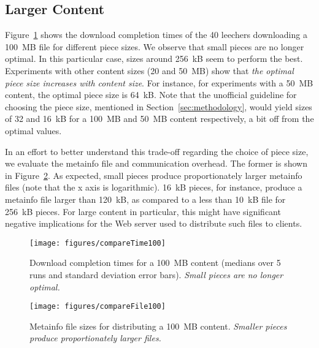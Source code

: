 \documentclass[twocolumn,letterpaper,11pt]{article}
\begin{document}
\subsection{Larger Content}

Figure~\ref{fig:large_contents-completion_comparison} shows the download 
completion times of the 40 leechers downloading a 100~MB file for different
piece sizes. 
We observe that small pieces are no longer optimal. In this particular
case, sizes around 256~kB seem to perform the best.
Experiments with other content sizes (20 and 50~MB) show that \emph{the optimal piece 
size increases with content size}. 
For instance, for experiments with a 50~MB content, the optimal piece size is 64~kB.
Note that the unofficial guideline for choosing the piece size, mentioned in 
Section~\ref{sec:methodology}, would yield sizes of 32 and 16~kB for a 100~MB and 50~MB
content respectively, a bit off from the optimal values.

In an effort to better understand this trade-off regarding the choice of piece size, we evaluate
the metainfo file and communication overhead. The former is
shown in Figure~\ref{fig:large_contents-metainfo_size}.
As expected, small pieces produce proportionately larger metainfo files (note that
the x axis is logarithmic).
16~kB pieces, for instance, 
produce a metainfo file larger than 120~kB, as compared to a less 
than 10~kB file for 256~kB pieces.
For large content in particular, this might have significant negative implications for 
the Web server used to distribute such files to clients.

\begin{figure}[t]
\centering
\texttt{[image: figures/compareTime100]}
\caption{Download completion times for a 100~MB content (medians over 5 runs and standard 
deviation error bars).
\emph{Small pieces are no longer optimal.}}
\label{fig:large_contents-completion_comparison}
\end{figure}

\begin{figure}
\centering
\texttt{[image: figures/compareFile100]}
\caption{Metainfo file sizes for distributing a 100~MB content.
\emph{Smaller pieces produce proportionately larger files.}}
\label{fig:large_contents-metainfo_size}
\end{figure}
\end{document}
